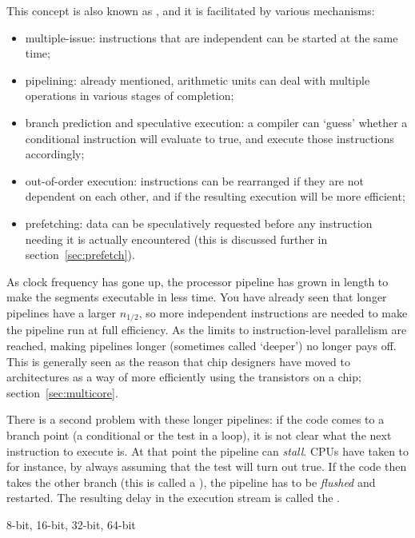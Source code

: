 This concept is also known as , and it is facilitated by
various mechanisms:
\begin{itemize}
\item multiple-issue: instructions that are independent can be started
  at the same time;
\item pipelining: already mentioned, arithmetic units can deal with
  multiple operations in various stages of completion;
\item branch prediction and speculative execution: a compiler can
  `guess' whether a conditional instruction will evaluate to true, and
  execute those instructions accordingly;
\item out-of-order execution: instructions can be rearranged if they
  are not dependent on each other, and if the resulting execution will
  be more efficient;
\item prefetching: data can be speculatively requested before any
  instruction needing it is actually encountered (this is discussed
  further in section~\ref{sec:prefetch}).
\end{itemize}

As clock frequency has gone up, the processor pipeline has grown in
length to make the segments executable in less time. You have already
seen that longer pipelines have a larger $n_{1/2}$, so more
independent instructions are needed to make the pipeline run at full
efficiency. As the limits to instruction-level parallelism are
reached, making pipelines longer (sometimes
called `deeper') no longer pays off. This is
generally seen as the reason that chip designers have moved to
 architectures as a way of more efficiently
using the transistors on a chip; section~\ref{sec:multicore}.

There is a second problem with these longer pipelines: if the code
comes to a branch point (a conditional or the test in a loop), it is
not clear what the next instruction to execute is. At that point the
pipeline can \emph{stall}. CPUs have taken to
 for instance, by always assuming
that the test will turn out true. If the code then takes the other
branch (this is called a ), the
pipeline has to be \emph{flushed} and
restarted. The resulting delay in the execution stream is called the
.

 {8-bit, 16-bit, 32-bit, 64-bit}

